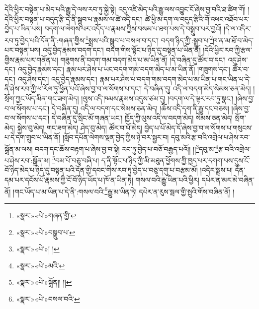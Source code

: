 དེའི་ཕྱིར་བསྟེན་པ་མེད་པའི་རྒྱུ་དེ་ལས་རབ་ཏུ་སྐྱེ་སྟེ། འདུ་འཛི་མེད་པའི་རྒྱུ་ལས་འབྱུང་ངོ་ཞེས་བྱ་བའི་ཐ་ཚིག་གོ། །དེའི་ཕྱིར་བསྟན་པ་བདུད་རྩི་དེ་ནི་སྒྲུབ་པ་རྣམས་ལ་ཚེ་འདི་དང་། ཚེ་ཕྱི་མ་དག་ལ་བདུད་རྩིའི་གོ་འཕང་འཐོབ་པར་བྱེད་པ་ཡིན་པས། བདག་ལ་ལེགས་པར་འདོད་པ་རྣམས་ཀྱིས་བསམ་པ་ཐག་པས་དེ་བསྒྲུབ་པར་བྱའོ། །དེ་ལ་འདིར་རབ་ཏུ་བྱེད་པའི་དོན་ནི་:གཞན་གྱིས་\footnote{«སྣར་»«པེ་»གཞན་གྱི་}སྨྲས་པའི་སྒྲུབ་པ་བསལ་བ་དང་། བདག་ཉིད་ཀྱི་:སྒྲུབ་པ་\footnote{«སྣར་»«པེ་»བསྒྲུབ་པ་}ཁ་ན་མ་ཐོ་བ་མེད་པར་བསྟན་པས། འདུ་བྱེད་རྣམས་བདག་དང་། བདག་གིས་སྟོང་པ་ཉིད་དུ་བསྟན་པ་ཡིན་ནོ། །དེའི་ཕྱིར་རབ་ཀྱི་རྩལ་གྱིས་རྣམ་པར་གནོན་པ། གཟུགས་ནི་བདག་གམ་བདག་མེད་པ་མ་ཡིན་ནོ། །དེ་བཞིན་དུ་ཚོར་བ་དང་། འདུ་ཤེས་དང་། འདུ་བྱེད་རྣམས་དང་། རྣམ་པར་ཤེས་པ་ཡང་བདག་གམ་བདག་མེད་པ་མ་ཡིན་ནོ། །གཟུགས་དང་། ཚོར་བ་དང་། འདུ་ཤེས་དང་། འདུ་བྱེད་རྣམས་དང་། རྣམ་པར་ཤེས་པ་བདག་གམ་བདག་མེད་པ་མ་ཡིན་པ་གང་ཡིན་པ་དེ་ནི་ཤེས་རབ་ཀྱི་ཕ་རོལ་ཏུ་ཕྱིན་པའོ་ཞེས་བྱ་བ་ལ་སོགས་པ་དང་། དེ་བཞིན་དུ། འདི་ལ་བདག་མེད་སེམས་ཅན་མེད། །སྲོག་ཀྱང་ཡོད་མིན་གང་ཟག་མེད། །ལུས་འདི་ཁམས་རྣམས་འདུས་ཙམ་དུ། །བདག་ལ་དེ་ལྟར་རབ་ཏུ་སྣང་། །ཞེས་བྱ་བ་ལ་སོགས་པ་དང་། དེ་བཞིན་དུ། འདི་ལ་བདག་དང་སེམས་ཅན་མེད། །ཆོས་འདི་དག་ནི་རྒྱུ་དང་བཅས། །ཞེས་བྱ་བ་ལ་སོགས་པ་དང་། དེ་བཞིན་དུ་སྲིང་མོ་གཞན་ཡང་། ཁྱོད་ཀྱི་ལུས་འདི་ལ་བདག་མེད། སེམས་ཅན་མེད། སྲོག་མེད། སྐྱེས་བུ་མེད། གང་ཟག་མེད། ཤེད་བུ་མེད། ཚོར་བ་པོ་མེད། བྱེད་པ་པོ་མེད་དོ་ཞེས་བྱ་བ་ལ་སོགས་པ་གསུངས་པ་དེ་དག་གྲུབ་པ་ཡིན་ནོ། །སློབ་དཔོན་ལེགས་ལྡན་བྱེད་ཀྱིས་ཉེ་བར་སྦྱར་བ། དབུ་མའི་རྩ་བའི་འགྲེལ་པ་ཤེས་རབ་སྒྲོན་མ་ལས། བདག་དང་ཆོས་བརྟག་པ་ཞེས་བྱ་བ་སྟེ། རབ་ཏུ་བྱེད་པ་བཅོ་བརྒྱད་པའོ།། །།\footnote{«སྣར་»«པེ་»། །}དབུ་མ་\footnote{«སྣར་»«པེ་»མའི་}རྩ་བའི་འགྲེལ་པ་ཤེས་རབ་:སྒྲོན་མ། \footnote{«སྣར་»«པེ་»སྒྲོན།། །། }བམ་པོ་བཅུ་བཞི་པ། ད་ནི་སྟོང་པ་ཉིད་ཀྱི་མི་མཐུན་ཕྱོགས་ཀྱི་ཁྱད་པར་དགག་པས་དུས་ངོ་བོ་ཉིད་མེད་པ་ཉིད་དུ་བསྟན་པའི་དོན་གྱི་དབང་གིས་རབ་ཏུ་བྱེད་པ་བཅུ་དགུ་པ་བརྩམ་མོ། །འདིར་སྨྲས་པ། དོན་དམ་པར་དངོས་པོ་རྣམས་ཀྱི་ངོ་བོ་ཉིད་ཡོད་པ་ཁོ་ན་ཡིན་ཏེ། གསལ་བའི་རྒྱུ་ཡིན་པའི་ཕྱིར། དཔེར་ན་མར་མེ་བཞིན་ནོ། །གང་ཡོད་པ་མ་ཡིན་པ་དེ་ནི་:གསལ་བའི་\footnote{«སྣར་»«པེ་»བསལ་བའི་}རྒྱུ་མ་ཡིན་ཏེ། དཔེར་ན་རུས་སྦལ་གྱི་སྤུའི་གོས་བཞིན་ནོ། །
